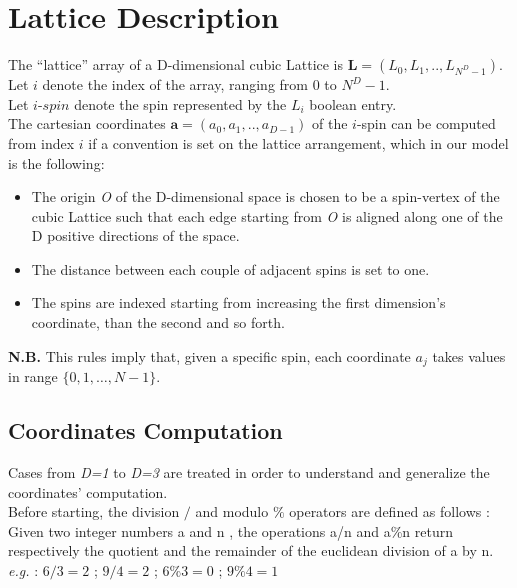 \documentclass[11]{article}
\begin{document}
\newcommand\tab[1][1cm]{\hspace*{#1}}

\section*{Lattice Description}

The “lattice” array of a D-dimensional cubic Lattice is $\mathbf{L} = (L_0,L_1,..,L_{N^D-1})$.
Let $i$ denote the index of the array, ranging from $0$ to $N^D-1$.\\
Let $i$-$spin$ denote the spin represented by the $L_i$ boolean entry. \\
The cartesian coordinates $\mathbf{a} = (a_0,a_1,..,a_{D-1})$ of the $i$-spin can be computed from index $i$ if a convention is set on the lattice arrangement, which in our model is the following: 
\begin{itemize}
	\item The origin \textit{O} of the D-dimensional space is chosen to be a spin-vertex of the cubic Lattice such that each edge starting from \textit{O} is aligned along one of the D positive directions of the space. 
	\item The distance between each couple of adjacent spins is set to one. 
	\item The spins are indexed starting from increasing the first dimension’s coordinate, than the second and so forth.
\end{itemize}


\textbf{N.B.} This rules imply that, given a specific spin, each coordinate $a_j$ takes values in range 
$\{0,1,…,N-1\}$. \\ 

\subsection*{Coordinates Computation}

Cases from \textit{D=1} to \textit{D=3} are treated in order to understand and generalize the coordinates’ computation. \\
Before starting, the division $/$ and modulo $\%$ operators are defined as follows : \\
Given two integer numbers a and n , the operations a/n and a\%n return respectively the quotient and the remainder of the euclidean division of a by n. \\ 
\textit{e.g.} : $6/3=2$ ; $9/4=2$ ; $6\%3=0$ ; $9\%4=1$ \\
\end{document}
